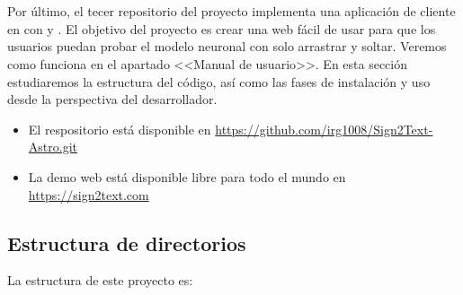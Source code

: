 

\section{}

Por último, el tecer repositorio del proyecto implementa una aplicación de cliente en  con   y  . El objetivo del proyecto es crear una web fácil de usar para que los usuarios puedan probar el modelo neuronal con solo arrastrar y soltar. Veremos como funciona en el apartado <<Manual de usuario>>. En esta sección estudiaremos la estructura del código, así como las fases de instalación y uso desde la perspectiva del desarrollador.

\begin{itemize}
  \item El respositorio está disponible en \url{https://github.com/irg1008/Sign2Text-Astro.git}
  \item La demo web está disponible libre para todo el mundo en \url{https://sign2text.com}
\end{itemize}

\subsection{Estructura de directorios}

La estructura de este proyecto es:

